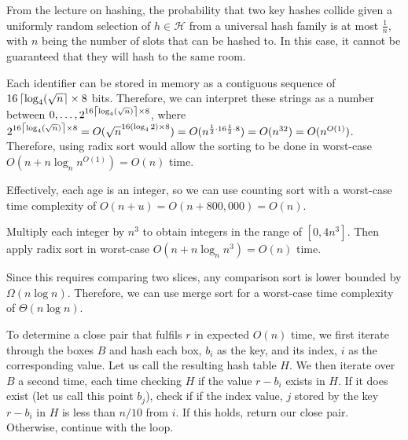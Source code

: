 \documentclass[12pt,twoside]{article}
\begin{document}
\begin{problems}
\begin{problemparts}
\problempart %
From the lecture on hashing, the probability that two key hashes collide given a uniformly random selection of $h \in \mathcal{H}$ from a universal hash family is at most $\frac{1}{n}$, with $n$ being the number of slots that can be hashed to. In this case, it cannot be guaranteed that they will hash to the same room.

\end{problemparts}

\newpage

\problem  %

\begin{problemparts}
\problempart %
Each identifier can be stored in memory as a contiguous sequence of $16\left\lceil \log_4(\sqrt{n} \right\rceil \times 8$ bits. Therefore, we can interpret these strings as a number between $0,\ldots,2^{16 \left\lceil \log_4 (\sqrt{n}) \right\rceil\times8}$, where $2^{16 \left\lceil \log_4 (\sqrt{n}) \right\rceil\times8}=O(\sqrt{n}^{16 (\log_4 2)\times 8})=O(n^{\frac{1}{2}\cdot 16 \frac{1}{2} \cdot 8})=O(n^{32})=O(n^{O(1)})$. Therefore, using radix sort would allow the sorting to be done in worst-case $O(n+n \log_n n^{O(1)})=O(n)$ time.

\problempart %
Effectively, each age is an integer, so we can use counting sort with a worst-case time complexity of  $O(n+u)=O(n+800,000)=O(n)$.

\problempart %
Multiply each integer by $n^3$ to obtain integers in the range of $[0,4n^3]$. Then apply radix sort in worst-case $O(n+n \log_n n^3)=O(n)$ time.

\problempart %
Since this requires comparing two slices, any comparison sort is lower bounded by $\Omega(n \log n)$. Therefore, we can use merge sort for a worst-case time complexity of $\Theta(n \log n)$.

\end{problemparts}

\newpage

\problem  %

\begin{problemparts}
\problempart %
To determine a close pair that fulfils $r$ in expected $O(n)$ time, we first iterate through the boxes $B$ and hash each box, $b_i$ as the key, and its index, $i$ as the corresponding value. Let us call the resulting hash table $H$. We then iterate over $B$ a second time, each time checking $H$ if the value $r-b_i$ exists in $H$. If it does exist (let us call this point $b_j$), check if if the index value, $j$ stored by the key $r-b_i$ in $H$ is less than $n/10$ from $i$. If this holds, return our close pair. Otherwise, continue with the loop.


\end{problemparts}
\end{problems}
\end{document}
